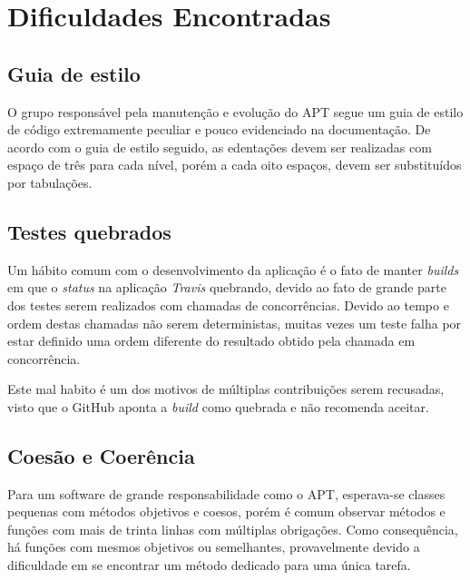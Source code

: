 \chapter{Dificuldades Encontradas} %
\label{cha:dificuldades_encontradas}

\section*{Guia de estilo} %
\label{sec:guia_de_estilo}

O grupo responsável pela manutenção e evolução do APT segue um guia de estilo de código extremamente peculiar e pouco evidenciado na documentação. De acordo com o guia de estilo seguido, as edentações devem ser realizadas com espaço de três para cada nível, porém a cada oito espaços, devem ser substituídos por tabulações.

\section*{Testes quebrados} %
\label{sec:testes_de_concorr_ncias}

Um hábito comum com o desenvolvimento da aplicação é o fato de manter \textit{builds} em que o \textit{status} na aplicação \textit{Travis} quebrando, devido ao fato de grande parte dos testes serem realizados com chamadas de concorrências. Devido ao tempo e ordem destas chamadas não serem deterministas, muitas vezes um teste falha por estar definido uma ordem diferente do resultado obtido pela chamada em concorrência.

Este mal habito é um dos motivos de múltiplas contribuições serem recusadas, visto que o GitHub aponta a \textit{build} como quebrada e não recomenda aceitar.


\section*{Coesão e Coerência} %
\label{sec:coes_o_e_coer_ncia}

Para um software de grande responsabilidade como o APT, esperava-se classes pequenas com métodos objetivos e coesos, porém é comum observar métodos e funções com mais de trinta linhas com múltiplas obrigações. Como consequência, há funções com mesmos objetivos ou semelhantes, provavelmente devido a dificuldade em se encontrar um método dedicado para uma única tarefa.

